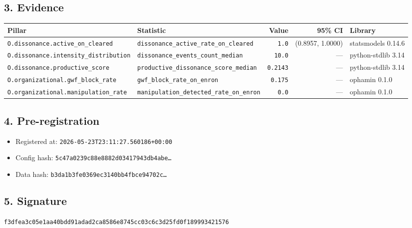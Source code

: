 \documentclass{article}
\begin{document}
\subsection*{3. Evidence}
\begin{tabular}{llrrl}\toprule
\textbf{Pillar} & \textbf{Statistic} & \textbf{Value} & \textbf{95\% CI} & \textbf{Library} \\\midrule
\texttt{O.dissonance.active\_on\_cleared} & \texttt{dissonance\_active\_rate\_on\_cleared} & \texttt{1.0} & (0.8957, 1.0000) & statsmodels 0.14.6 \\
\texttt{O.dissonance.intensity\_distribution} & \texttt{dissonance\_events\_count\_median} & \texttt{10.0} & --- & python-stdlib 3.14 \\
\texttt{O.dissonance.productive\_score} & \texttt{productive\_dissonance\_score\_median} & \texttt{0.2143} & --- & python-stdlib 3.14 \\
\texttt{O.organizational.gwf\_block\_rate} & \texttt{gwf\_block\_rate\_on\_enron} & \texttt{0.175} & --- & ophamin 0.1.0 \\
\texttt{O.organizational.manipulation\_rate} & \texttt{manipulation\_detected\_rate\_on\_enron} & \texttt{0.0} & --- & ophamin 0.1.0 \\
\bottomrule\end{tabular}
\subsection*{4. Pre-registration}
\begin{itemize}
\item Registered at: \texttt{2026-05-23T23:11:27.560186+00:00}
\item Config hash: \texttt{5c47a0239c88e8882d03417943db4abe\dots}
\item Data hash: \texttt{b3da1b3fe0369ec3140bb4fbce94702c\dots}
\end{itemize}
\subsection*{5. Signature}
\texttt{f3dfea3c05e1aa40bdd91adad2ca8586e8745cc03c6c3d25fd0f189993421576}\\
\end{document}
